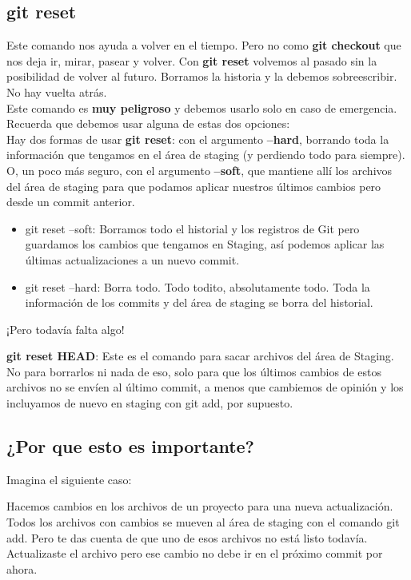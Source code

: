 \documentclass{article}
\begin{document}
\subsection*{git reset}%
Este comando nos ayuda a volver en el tiempo. Pero no como \textbf{git
checkout} que nos deja ir, mirar, pasear y volver. Con \textbf{git reset}
volvemos al pasado sin la posibilidad de volver al futuro. Borramos la historia
y la debemos sobreescribir. No hay vuelta atrás.\\

Este comando es \textbf{muy peligroso} y debemos usarlo solo en caso de
emergencia. Recuerda que debemos usar alguna de estas dos opciones:\\

Hay dos formas de usar \textbf{git reset}: con el argumento \textbf{--hard},
borrando toda la información que tengamos en el área de staging (y perdiendo
todo para siempre). O, un poco más seguro, con el argumento \textbf{--soft},
que mantiene allí los archivos del área de staging para que podamos aplicar
nuestros últimos cambios pero desde un commit anterior.

\begin{itemize}
  \item git reset --soft: Borramos todo el historial y los registros de Git
    pero guardamos los cambios que tengamos en Staging, así podemos aplicar las
    últimas actualizaciones a un nuevo commit.
  \item git reset --hard: Borra todo. Todo todito, absolutamente todo. Toda la
    información de los commits y del área de staging se borra del historial.
\end{itemize}

¡Pero todavía falta algo!

\textbf{git reset HEAD}: Este es el comando para sacar archivos del área de
Staging. No para borrarlos ni nada de eso, solo para que los últimos cambios de
estos archivos no se envíen al último commit, a menos que cambiemos de opinión
y los incluyamos de nuevo en staging con git add, por supuesto.

\subsection*{¿Por que esto es importante?}%
Imagina el siguiente caso:

Hacemos cambios en los archivos de un proyecto para una nueva actualización.
Todos los archivos con cambios se mueven al área de staging con el comando git
add. Pero te das cuenta de que uno de esos archivos no está listo todavía.
Actualizaste el archivo pero ese cambio no debe ir en el próximo commit por
ahora.\\
\end{document}

